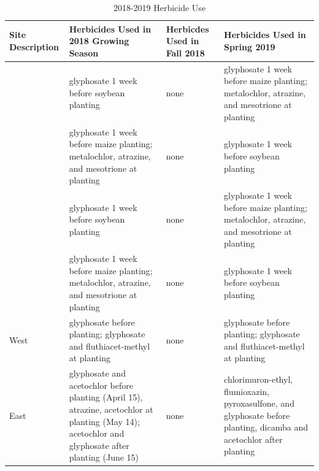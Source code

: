 \documentclass[
]{article}
\begin{document}
\newpage

\begin{table}[H]

\caption{\label{tab:herbtable}2018-2019 Herbicide Use}
\centering
\begin{tabular}[t]{>{\centering\arraybackslash}p{8em}>{\centering\arraybackslash}p{8em}>{\centering\arraybackslash}p{8em}>{\centering\arraybackslash}p{8em}}
\toprule
Site Description & Herbicides Used in 2018 Growing Season & Herbicdes Used in Fall 2018 & Herbicides Used in Spring 2019\\
\midrule
\rowcolor{gray!6}   & glyphosate 1 week before soybean planting & none & glyphosate 1 week before maize planting; metalochlor, atrazine, and mesotrione at planting\\

\multirow{-2}{8em}{\centering\arraybackslash Central Grain} & glyphosate 1 week before maize planting; metalochlor, atrazine, and mesotrione at planting & none & glyphosate 1 week before soybean planting\\
\cmidrule{1-4}
\rowcolor{gray!6}   & glyphosate 1 week before soybean planting & none & glyphosate 1 week before maize planting; metalochlor, atrazine, and mesotrione at planting\\

\multirow{-2}{8em}{\centering\arraybackslash Central Silage} & glyphosate 1 week before maize planting; metalochlor, atrazine, and mesotrione at planting & none & glyphosate 1 week before soybean planting\\
\cmidrule{1-4}
\rowcolor{gray!6}  West & glyphosate before planting; glyphosate and fluthiacet-methyl at planting & none & glyphosate before planting; glyphosate and fluthiacet-methyl at planting\\
\cmidrule{1-4}
East & glyphosate and acetochlor  before planting (April 15), atrazine, acetochlor at planting (May 14); acetochlor and glyphosate after planting (June 15) & none & chlorimuron-ethyl, flumioxazin, pyroxasulfone, and glyphosate before planting, dicamba and acetochlor after planting\\
\bottomrule
\end{tabular}
\end{table}

\newpage
\end{document}
